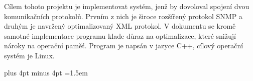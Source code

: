 \documentclass[11pt,twoside,a4paper]{book}   %
\begin{document}

\vspace{8ex}

\noindent
Cílem tohoto projektu je implementovat systém, jenž by dovoloval spojení dvou komunikačních protokolů. 
Prvním z nich je široce rozšířený protokol SNMP a druhým je navržený optimalizovaný XML protokol. V dokumentu
se kromě samotné implementace programu klade důraz na optimalizace, které snižují nároky na operační paměť. Program
je napsán v jazyce C++, cílový operační systém je Linux. 



\tableofcontents



\listoffigures



\listoftables

\mainbodystarts
\parskip=5pt plus 4pt minus 4pt
\parindent=1.5em












\appendix





\end{document}
